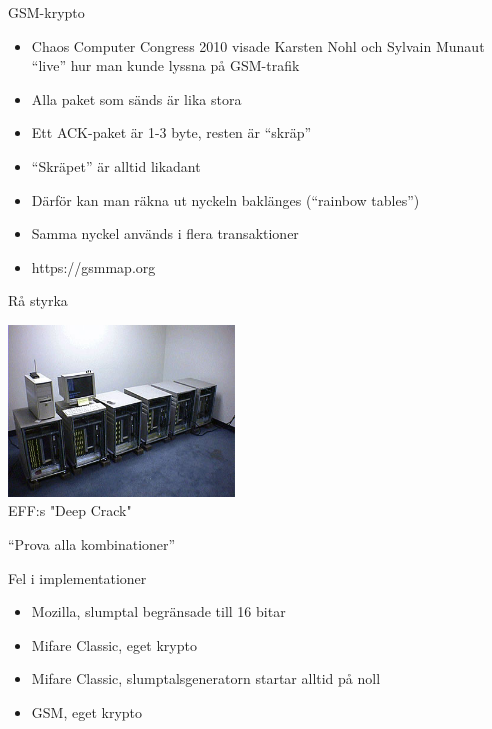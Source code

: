 \documentclass{beamer}
\begin{document}
\begin{frame}{GSM-krypto}
\begin{itemize}
\item Chaos Computer Congress 2010 visade Karsten Nohl och Sylvain Munaut 
  ``live'' hur man kunde lyssna på GSM-trafik
\pause \item Alla paket som sänds är lika stora
\pause \item Ett ACK-paket är 1-3 byte, resten är ``skräp''
\pause \item ``Skräpet'' är alltid likadant
\pause \item Därför kan man räkna ut nyckeln baklänges (``rainbow tables'')
\pause \item Samma nyckel används i flera transaktioner
\pause \item https://gsmmap.org
\end{itemize}
\end{frame}

\begin{frame}{Rå styrka}
\begin{center}
\parbox{6cm}{\sloppy \includegraphics[width=6cm]{images/DES-machine}\\
\tiny{EFF:s "Deep Crack"}}
\parbox{6cm}{ \sloppy
\begin{center}
 ``Prova alla kombinationer''
\end{center}}
\end{center}
\end{frame}

\begin{frame}{Fel i implementationer}
\begin{itemize}
\pause \item Mozilla, slumptal begränsade till 16 bitar
\pause \item Mifare Classic, eget krypto
\pause \item Mifare Classic, slumptalsgeneratorn startar alltid på noll
\pause \item GSM, eget krypto
\end{itemize}
\end{frame}
\end{document}

